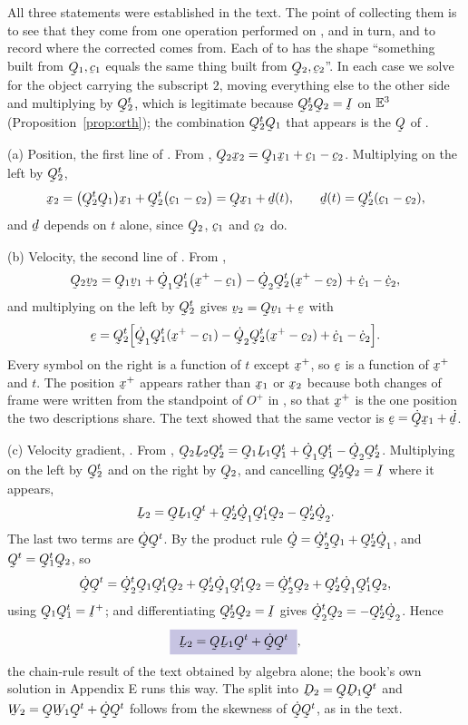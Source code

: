 \begin{solution}
All three statements were established in the text. The point of
collecting them is to see that they come from one operation performed on
,  and  in turn, and to record where the
corrected  comes from. Each of  to  has the
shape ``something built from $\bQ_{1},\bc_{1}$ equals the same thing
built from $\bQ_{2},\bc_{2}$''. In each case we solve for the object
carrying the subscript $2$, moving everything else to the other side
and multiplying by $\bQ_{2}^{t}$, which is legitimate because
$\bQ_{2}^{t}\bQ_{2}=\I$ on $\mathbb{E}^{3}$ (Proposition~\ref{prop:orth}); the
combination $\bQ_{2}^{t}\bQ_{1}$ that appears is the $\bQ$ of
.

(a) Position, the first line of . From ,
$\bQ_{2}\bx_{2}=\bQ_{1}\bx_{1}+\bc_{1}-\bc_{2}$. Multiplying on the left
by $\bQ_{2}^{t}$,
\[
   \bx_{2}=\big(\bQ_{2}^{t}\bQ_{1}\big)\bx_{1}
   +\bQ_{2}^{t}\big(\bc_{1}-\bc_{2}\big)
   =\bQ\bx_{1}+\bd(t),
   \qquad \bd(t)=\bQ_{2}^{t}(\bc_{1}-\bc_{2}),
\]
and $\bd$ depends on $t$ alone, since $\bQ_{2}$, $\bc_{1}$ and $\bc_{2}$
do.

(b) Velocity, the second line of . From ,
\[
   \bQ_{2}\bv_{2}=\bQ_{1}\bv_{1}
   +\dot\bQ_{1}\bQ_{1}^{t}\big(\bx^{+}-\bc_{1}\big)
   -\dot\bQ_{2}\bQ_{2}^{t}\big(\bx^{+}-\bc_{2}\big)
   +\dot\bc_{1}-\dot\bc_{2},
\]
and multiplying on the left by $\bQ_{2}^{t}$ gives
$\bv_{2}=\bQ\bv_{1}+\be$ with
\[
   \be=\bQ_{2}^{t}\Big[\dot\bQ_{1}\bQ_{1}^{t}(\bx^{+}-\bc_{1})
   -\dot\bQ_{2}\bQ_{2}^{t}(\bx^{+}-\bc_{2})
   +\dot\bc_{1}-\dot\bc_{2}\Big].
\]
Every symbol on the right is a function of $t$ except $\bx^{+}$, so $\be$
is a function of $\bx^{+}$ and $t$. The position $\bx^{+}$ appears rather
than $\bx_{1}$ or $\bx_{2}$ because both changes of frame were written
from the standpoint of $O^{+}$ in , so that $\bx^{+}$ is the one
position the two descriptions share. The text showed that the same
vector is $\be=\dot\bQ\bx_{1}+\dot\bd$.

(c) Velocity gradient, . From ,
$\bQ_{2}\bL_{2}\bQ_{2}^{t}=\bQ_{1}\bL_{1}\bQ_{1}^{t}
+\dot\bQ_{1}\bQ_{1}^{t}-\dot\bQ_{2}\bQ_{2}^{t}$. Multiplying on the left
by $\bQ_{2}^{t}$ and on the right by $\bQ_{2}$, and cancelling
$\bQ_{2}^{t}\bQ_{2}=\I$ where it appears,
\[
   \bL_{2}=\bQ\bL_{1}\bQ^{t}
   +\bQ_{2}^{t}\dot\bQ_{1}\bQ_{1}^{t}\bQ_{2}-\bQ_{2}^{t}\dot\bQ_{2}.
\]
The last two terms are $\dot\bQ\bQ^{t}$. By the product rule
$\dot\bQ=\dot\bQ_{2}^{t}\bQ_{1}+\bQ_{2}^{t}\dot\bQ_{1}$, and
$\bQ^{t}=\bQ_{1}^{t}\bQ_{2}$, so
\[
   \dot\bQ\bQ^{t}
   =\dot\bQ_{2}^{t}\bQ_{1}\bQ_{1}^{t}\bQ_{2}
    +\bQ_{2}^{t}\dot\bQ_{1}\bQ_{1}^{t}\bQ_{2}
   =\dot\bQ_{2}^{t}\bQ_{2}+\bQ_{2}^{t}\dot\bQ_{1}\bQ_{1}^{t}\bQ_{2},
\]
using $\bQ_{1}\bQ_{1}^{t}=\I^{+}$; and differentiating
$\bQ_{2}^{t}\bQ_{2}=\I$ gives
$\dot\bQ_{2}^{t}\bQ_{2}=-\bQ_{2}^{t}\dot\bQ_{2}$. Hence
\[
   \boxed{\ \bL_{2}=\bQ\bL_{1}\bQ^{t}+\dot\bQ\bQ^{t}\ },
\]
the chain-rule result of the text obtained by algebra alone; the book's
own solution in Appendix E runs this way. The split into
$\bD_{2}=\bQ\bD_{1}\bQ^{t}$ and $\bW_{2}=\bQ\bW_{1}\bQ^{t}+\dot\bQ\bQ^{t}$
follows from the skewness of $\dot\bQ\bQ^{t}$, as in the text.


\end{solution}
